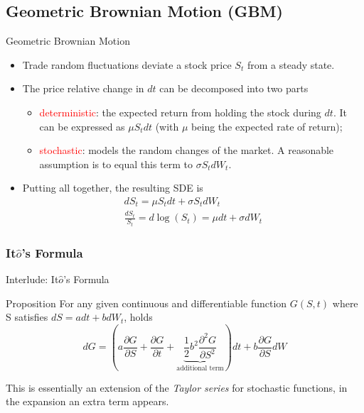 \documentclass{beamer}
\begin{document}
\subsection{Geometric Brownian Motion (GBM)}
\begin{frame}{Geometric Brownian Motion}
	\begin{itemize}
		\item Trade random fluctuations deviate a stock price $S_t$ from a steady state.
		\item The price relative change in $dt$ can be decomposed into two parts
		\begin{itemize}
			\item \textcolor{red}{deterministic}: the expected return from holding the stock during $dt$. It can be expressed as $\mu S_tdt$ (with $\mu$ being the expected rate of return);
			\item \textcolor{red}{stochastic}: models the random changes of the market. A reasonable assumption is to equal this term to $\sigma S_t dW_t$. 
		\end{itemize}
		\item Putting all together, the resulting SDE is
		\begin{equation}
			\begin{gathered}
				dS_t = \mu S_t dt + \sigma S_t dW_t \\
				\frac{dS_t}{S_t} = d\log(S_t) = \mu dt + \sigma dW_t
			\end{gathered}
			\label{eq:log_normal_sde}
		\end{equation}
	\end{itemize}
\end{frame}

\subsubsection{It$\hat{o}$'s Formula}
\begin{frame}{Interlude: It$\hat{o}$'s Formula}
	\begin{block}{Proposition}
		For any given continuous and differentiable function $G(S,t)$ where S satisfies $dS=adt + bdW_t$, holds
		\begin{equation}
			dG = \left(a\frac{\partial G}{\partial S} + \frac{\partial G}{\partial t} + \underbrace{\frac{1}{2}b^2\frac{\partial^2 G}{\partial S^2}}_{\text{additional term}}\right)dt + b\frac{\partial G}{\partial S} dW
			\label{eq:itos_lemma}
		\end{equation}

	This is essentially an extension of the \emph{Taylor series} for stochastic functions, in the expansion an extra term appears.	
	\end{block}	
\end{frame}
\end{document}

